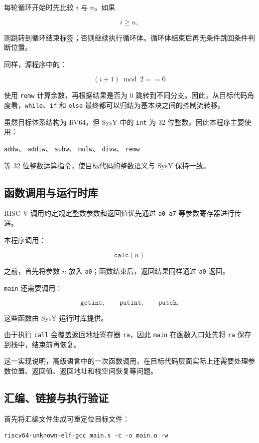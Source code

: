 \documentclass[12pt,a4paper]{ctexart}
\begin{document}
每轮循环开始时先比较 $i$ 与 $n$。如果

\[
i\ge n,
\]

则跳转到循环结束标签；否则继续执行循环体。循环体结束后再无条件跳回条件判断位置。

同样，源程序中的：

\[
(i+1)\bmod2==0
\]

使用 \texttt{remw} 计算余数，再根据结果是否为 0 跳转到不同分支。因此，从目标代码角度看，\texttt{while}、\texttt{if} 和 \texttt{else} 最终都可以归结为基本块之间的控制流转移。

虽然目标体系结构为 RV64，但 SysY 中的 \texttt{int} 为 32 位整数。因此本程序主要使用：

\begin{center}
\texttt{addw}、
\texttt{addiw}、
\texttt{subw}、
\texttt{mulw}、
\texttt{divw}、
\texttt{remw}
\end{center}

等 32 位整数运算指令，使目标代码的整数语义与 SysY 保持一致。

\subsection{函数调用与运行时库}

RISC-V 调用约定规定整数参数和返回值优先通过 \texttt{a0--a7} 等参数寄存器进行传递。

本程序调用：

\[
\texttt{calc}(n)
\]

之前，首先将参数 $n$ 放入 \texttt{a0}；函数结束后，返回结果同样通过 \texttt{a0} 返回。

\texttt{main} 还需要调用：

\[
\texttt{getint},
\qquad
\texttt{putint},
\qquad
\texttt{putch}.
\]

这些函数由 SysY 运行时库提供。

由于执行 \texttt{call} 会覆盖返回地址寄存器 \texttt{ra}，因此 \texttt{main} 在函数入口处先将 \texttt{ra} 保存到栈中，结束前再恢复。

这一实现说明，高级语言中的一次函数调用，在目标代码层面实际上还需要处理参数位置、返回值、返回地址和栈空间恢复等问题。

\subsection{汇编、链接与执行验证}

首先将汇编文件生成可重定位目标文件：

\begin{lstlisting}
riscv64-unknown-elf-gcc main.s -c -o main.o -w
\end{lstlisting}
\end{document}
